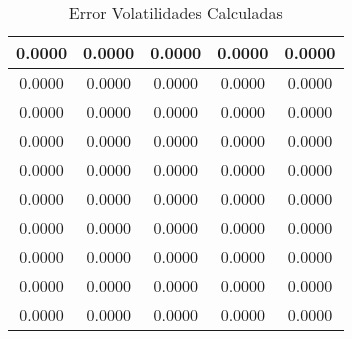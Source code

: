 \begin{table}                                
\centering                                   
\begin{tabular}{|c|c|c|c|c|}                 
\hline                                       
0.0000 & 0.0000 & 0.0000 & 0.0000 & 0.0000 \\
\hline                                       
0.0000 & 0.0000 & 0.0000 & 0.0000 & 0.0000 \\
\hline                                       
0.0000 & 0.0000 & 0.0000 & 0.0000 & 0.0000 \\
\hline                                       
0.0000 & 0.0000 & 0.0000 & 0.0000 & 0.0000 \\
\hline                                       
0.0000 & 0.0000 & 0.0000 & 0.0000 & 0.0000 \\
\hline                                       
0.0000 & 0.0000 & 0.0000 & 0.0000 & 0.0000 \\
\hline                                       
0.0000 & 0.0000 & 0.0000 & 0.0000 & 0.0000 \\
\hline                                       
0.0000 & 0.0000 & 0.0000 & 0.0000 & 0.0000 \\
\hline                                       
0.0000 & 0.0000 & 0.0000 & 0.0000 & 0.0000 \\
\hline                                       
0.0000 & 0.0000 & 0.0000 & 0.0000 & 0.0000 \\
\hline                                       
\end{tabular}                                
\caption{Error Volatilidades Calculadas}                     
\label{table:MyTableLabel}                   
\end{table}  

